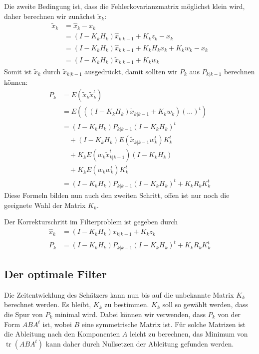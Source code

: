 Die zweite Bedingung ist, dass die Fehlerkovarianzmatrix möglichst klein wird,
daher berechnen wir zunächst $\tilde x_{k}$:
\begin{align*}
\tilde x_{k}&=\hat x_{k}-x_{k}\\
&=(I-K_{k}H_{k})\hat x_{k|k-1}+K_{k}z_{k}-x_{k}\\
&=(I-K_{k}H_{k})\hat x_{k|k-1}+K_{k}H_{k}x_{k}+K_{k}w_k-x_{k}\\
&=(I-K_{k}H_{k})\tilde x_{k|k-1}+K_{k}w_k
\end{align*}
Somit ist $\tilde x_{k}$ durch $\tilde x_{k|k-1}$ ausgedrückt, damit sollten
wir $P_{k}$ aus $P_{k|k-1}$ berechnen können:
\begin{align*}
P_{k}&=E(\tilde x_{k}\tilde x_{k}^t)\\
&=E(
((I-K_{k}H_{k})\tilde x_{k|k-1}+K_{k}w_k)
(\dots)^t
)\\
&=(I-K_{k}H_{k})P_{k|k-1}(I-K_{k}H_{k})^t\\
&\quad +(I-K_{k}H_{k})E(\tilde x_{k|k-1}w_k^t)K_{k}^t\\
&\quad+K_{k}E(w_k\tilde x_{k|k-1}^t)(I-K_{k}H_{k})\\
&\quad+K_{k}E(w_kw_k^t)K_{k}^t\\
&=(I-K_{k}H_{k})P_{k|k-1}(I-K_{k}H_{k})^t +K_{k}R_kK_{k}^t
\end{align*}
Diese Formeln bilden nun auch den zweiten Schritt, offen ist nur noch die
geeignete Wahl der Matrix $K_{k}$.
\begin{definition}
Der Korrekturschritt im Filterproblem ist gegeben durch
\begin{align}
\hat x_{k}&=(I-K_{k}H_{k})x_{k|k-1}+K_{k}z_{k} \label{estimate-correction}\\
P_{k} &=(I-K_{k}H_{k})P_{k|k-1}(I-K_{k}H_{k})^t +K_{k}R_kK_{k}^t \label{covariance-correction}
\end{align}
\end{definition}

\subsection{Der optimale Filter}
Die Zeitentwicklung des Schätzers kann nun bis auf die unbekannte Matrix $K_k$
berechnet werden.
Es bleibt, $K_k$ zu bestimmen.
$K_k$ soll so gewählt werden,
dass die Spur von $P_{k}$ minimal wird.
Dabei können wir verwenden,
dass $P_{k}$ von der Form $ABA^t$ ist, wobei $B$ eine symmetrische
Matrix ist.
Für solche Matrizen ist die Ableitung nach den Komponenten
$A$ leicht zu berechnen, das Minimum von $\operatorname{tr}(ABA^t)$
kann daher durch Nullsetzen der Ableitung gefunden werden.

